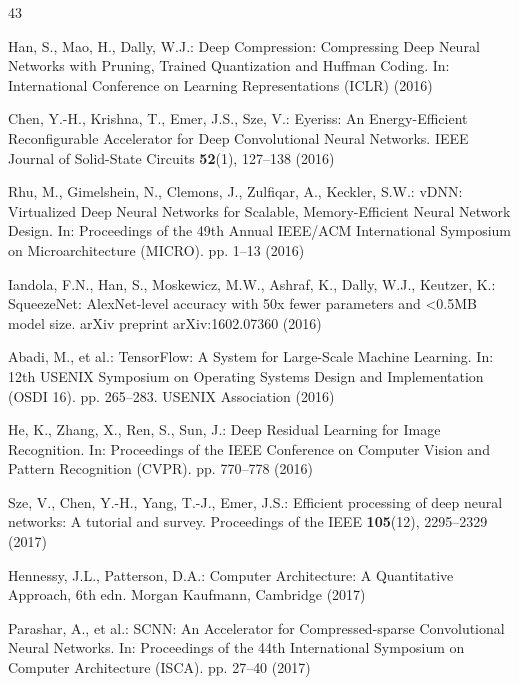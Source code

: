 \documentclass[conference]{IEEEtran}
\begin{document}
\begin{thebibliography}{43}

Han, S., Mao, H., Dally, W.J.: Deep Compression: Compressing Deep Neural Networks with Pruning, Trained Quantization and Huffman Coding. In: International Conference on Learning Representations (ICLR) (2016)


Chen, Y.-H., Krishna, T., Emer, J.S., Sze, V.: Eyeriss: An Energy-Efficient Reconfigurable Accelerator for Deep Convolutional Neural Networks. IEEE Journal of Solid-State Circuits \textbf{52}(1), 127--138 (2016)


Rhu, M., Gimelshein, N., Clemons, J., Zulfiqar, A., Keckler, S.W.: vDNN: Virtualized Deep Neural Networks for Scalable, Memory-Efficient Neural Network Design. In: Proceedings of the 49th Annual IEEE/ACM International Symposium on Microarchitecture (MICRO). pp. 1--13 (2016)


Iandola, F.N., Han, S., Moskewicz, M.W., Ashraf, K., Dally, W.J., Keutzer, K.: SqueezeNet: AlexNet-level accuracy with 50x fewer parameters and <0.5MB model size. arXiv preprint arXiv:1602.07360 (2016)


Abadi, M., et al.: TensorFlow: A System for Large-Scale Machine Learning. In: 12th USENIX Symposium on Operating Systems Design and Implementation (OSDI 16). pp. 265--283. USENIX Association (2016)


He, K., Zhang, X., Ren, S., Sun, J.: Deep Residual Learning for Image Recognition. In: Proceedings of the IEEE Conference on Computer Vision and Pattern Recognition (CVPR). pp. 770--778 (2016)


Sze, V., Chen, Y.-H., Yang, T.-J., Emer, J.S.: Efficient processing of deep neural networks: A tutorial and survey. Proceedings of the IEEE \textbf{105}(12), 2295--2329 (2017)


Hennessy, J.L., Patterson, D.A.: Computer Architecture: A Quantitative Approach, 6th edn. Morgan Kaufmann, Cambridge (2017)


Parashar, A., et al.: SCNN: An Accelerator for Compressed-sparse Convolutional Neural Networks. In: Proceedings of the 44th International Symposium on Computer Architecture (ISCA). pp. 27--40 (2017)


\end{thebibliography}
\end{document}
